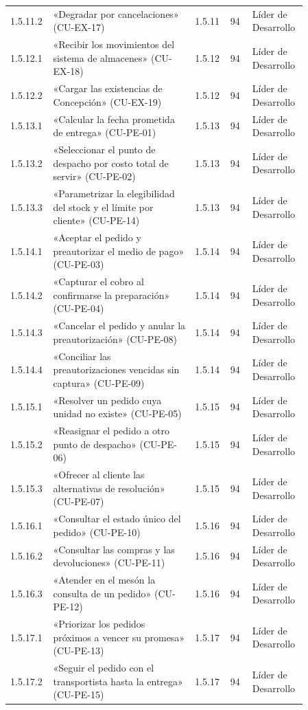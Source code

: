 \begin{longtable}{@{}p{0.075\linewidth}p{0.451\linewidth}p{0.075\linewidth}p{0.075\linewidth}p{0.179\linewidth}@{}}
1.5.11.2 & «Degradar por cancelaciones» (CU-EX-17) & 1.5.11 & 94 & Líder de Desarrollo \\
1.5.12.1 & «Recibir los movimientos del sistema de almacenes» (CU-EX-18) & 1.5.12 & 94 & Líder de Desarrollo \\
1.5.12.2 & «Cargar las existencias de Concepción» (CU-EX-19) & 1.5.12 & 94 & Líder de Desarrollo \\
1.5.13.1 & «Calcular la fecha prometida de entrega» (CU-PE-01) & 1.5.13 & 94 & Líder de Desarrollo \\
1.5.13.2 & «Seleccionar el punto de despacho por costo total de servir» (CU-PE-02) & 1.5.13 & 94 & Líder de Desarrollo \\
1.5.13.3 & «Parametrizar la elegibilidad del stock y el límite por cliente» (CU-PE-14) & 1.5.13 & 94 & Líder de Desarrollo \\
1.5.14.1 & «Aceptar el pedido y preautorizar el medio de pago» (CU-PE-03) & 1.5.14 & 94 & Líder de Desarrollo \\
1.5.14.2 & «Capturar el cobro al confirmarse la preparación» (CU-PE-04) & 1.5.14 & 94 & Líder de Desarrollo \\
1.5.14.3 & «Cancelar el pedido y anular la preautorización» (CU-PE-08) & 1.5.14 & 94 & Líder de Desarrollo \\
1.5.14.4 & «Conciliar las preautorizaciones vencidas sin captura» (CU-PE-09) & 1.5.14 & 94 & Líder de Desarrollo \\
1.5.15.1 & «Resolver un pedido cuya unidad no existe» (CU-PE-05) & 1.5.15 & 94 & Líder de Desarrollo \\
1.5.15.2 & «Reasignar el pedido a otro punto de despacho» (CU-PE-06) & 1.5.15 & 94 & Líder de Desarrollo \\
1.5.15.3 & «Ofrecer al cliente las alternativas de resolución» (CU-PE-07) & 1.5.15 & 94 & Líder de Desarrollo \\
1.5.16.1 & «Consultar el estado único del pedido» (CU-PE-10) & 1.5.16 & 94 & Líder de Desarrollo \\
1.5.16.2 & «Consultar las compras y las devoluciones» (CU-PE-11) & 1.5.16 & 94 & Líder de Desarrollo \\
1.5.16.3 & «Atender en el mesón la consulta de un pedido» (CU-PE-12) & 1.5.16 & 94 & Líder de Desarrollo \\
1.5.17.1 & «Priorizar los pedidos próximos a vencer su promesa» (CU-PE-13) & 1.5.17 & 94 & Líder de Desarrollo \\
1.5.17.2 & «Seguir el pedido con el transportista hasta la entrega» (CU-PE-15) & 1.5.17 & 94 & Líder de Desarrollo \\

\end{longtable}
